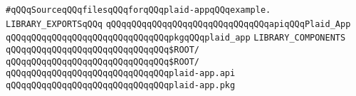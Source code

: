 \label{src/lib/x-kit/tut/plaid/plaid-app.lib}
\verb|#qQQqSourceqQQqfilesqQQqforqQQqplaid-appqQQqexample.|\newline
\newline
\verb|LIBRARY_EXPORTSqQQq|\newline
\newline
\verb|qQQqqQQqqQQqqQQqqQQqqQQqqQQqqQQqapiqQQqPlaid_App|\newline
\verb|qQQqqQQqqQQqqQQqqQQqqQQqqQQqqQQqpkgqQQqplaid_app|\newline
\newline
\verb|LIBRARY_COMPONENTS|\newline
\newline
\verb|qQQqqQQqqQQqqQQqqQQqqQQqqQQqqQQq$ROOT/|\newline
\verb|qQQqqQQqqQQqqQQqqQQqqQQqqQQqqQQq$ROOT/|\newline
\newline
\verb|qQQqqQQqqQQqqQQqqQQqqQQqqQQqqQQqplaid-app.api|\newline
\verb|qQQqqQQqqQQqqQQqqQQqqQQqqQQqqQQqplaid-app.pkg|\newline

